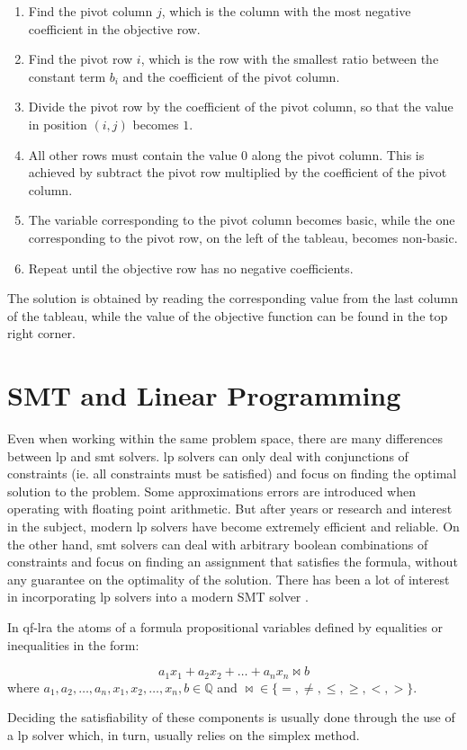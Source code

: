 \begin{enumerate}
    \item Find the pivot column $j$, which is the column with the most negative coefficient in the objective row.
    \item Find the pivot row $i$, which is the row with the smallest ratio between the constant term $b_i$ and the coefficient of the pivot column.
    \item Divide the pivot row by the coefficient of the pivot column, so that the value in position $(i, j)$ becomes $1$.
    \item All other rows must contain the value $0$ along the pivot column. This is achieved by subtract the pivot row multiplied by the coefficient of the pivot column.
    \item The variable corresponding to the pivot column becomes basic, while the one corresponding to the pivot row, on the left of the tableau, becomes non-basic.
    \item Repeat until the objective row has no negative coefficients.
\end{enumerate}

The solution is obtained by reading the corresponding value from the last column of the tableau, while the value of the objective function can be found in the top right corner.

\section{SMT and Linear Programming}

Even when working within the same problem space, there are many differences between \gls{lp} and \gls{smt} solvers.
\gls{lp} solvers can only deal with conjunctions of constraints (ie. all constraints must be satisfied) and focus on finding the optimal solution to the problem.
Some approximations errors are introduced when operating with floating point arithmetic.
But after years or research and interest in the subject, modern \gls{lp} solvers have become extremely efficient and reliable.
On the other hand, \gls{smt} solvers can deal with arbitrary boolean combinations of constraints and focus on finding an assignment that satisfies the formula, without any guarantee on the optimality of the solution.
There has been a lot of interest in incorporating \gls{lp} solvers into a modern SMT solver \cite{paper:lp-for-smt}.

In \gls{qf-lra} the atoms of a formula propositional variables defined by equalities or inequalities in the form:

\begin{equation*}
    a_1 x_1 + a_2 x_2 + \dots + a_n x_n \bowtie b
\end{equation*}
where $a_1, a_2, \dots, a_n, x_1, x_2, \dots, x_n, b \in \mathbb{Q}$ and $\bowtie \in \{ =, \neq, \leq, \geq, <, > \}$.

Deciding the satisfiability of these components is usually done through the use of a \gls{lp} solver which, in turn, usually relies on the simplex method.
